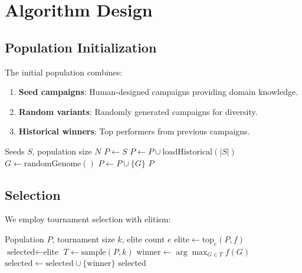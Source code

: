 \section{Algorithm Design}


\subsection{Population Initialization}

The initial population combines:

\begin{enumerate}
\item \textbf{Seed campaigns}: Human-designed campaigns providing domain knowledge.
\item \textbf{Random variants}: Randomly generated campaigns for diversity.
\item \textbf{Historical winners}: Top performers from previous campaigns.
\end{enumerate}

\begin{algorithm}
\caption{Population Initialization}
\begin{algorithmic}[1]
\REQUIRE Seeds $S$, population size $N$
\STATE $P \leftarrow S$
\STATE $P \leftarrow P \cup \text{loadHistorical}(|S|)$
    \STATE $G \leftarrow \text{randomGenome}()$
        \STATE $P \leftarrow P \cup \{G\}$
    \ENDIF
\ENDWHILE
\RETURN $P$
\end{algorithmic}
\end{algorithm}

\subsection{Selection}

We employ tournament selection with elitism:

\begin{algorithm}
\caption{Tournament Selection}
\begin{algorithmic}[1]
\REQUIRE Population $P$, tournament size $k$, elite count $e$
\STATE $\text{elite} \leftarrow \text{top}_e(P, f)$
\STATE $\text{selected} \leftarrow \text{elite}$
    \STATE $T \leftarrow \text{sample}(P, k)$
    \STATE $\text{winner} \leftarrow \arg\max_{G \in T} f(G)$
    \STATE $\text{selected} \leftarrow \text{selected} \cup \{\text{winner}\}$
\ENDWHILE
\RETURN selected
\end{algorithmic}
\end{algorithm}

